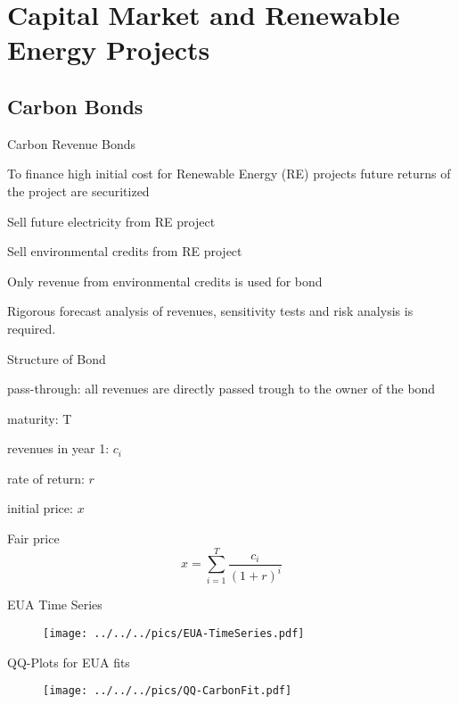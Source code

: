 \section{Capital Market and Renewable Energy Projects}
\subsection{Carbon Bonds}

{Carbon Revenue Bonds}


	To finance high initial cost for Renewable Energy (RE) projects future returns of the project are securitized

	


	Sell future electricity from RE project

	Sell environmental credits from RE project


	Only revenue from environmental credits is used for bond

	Rigorous forecast analysis of revenues, sensitivity tests and risk analysis is required.


{Structure of Bond}


	pass-through: all revenues are directly passed trough to the owner of the bond

	


	maturity: T

	revenues in year 1: $c_i$

	rate of return: $r$

	initial price: $x$


	Fair price
$$
x= \sum_{i=1}^T \frac{c_i}{(1+r)^i}
$$


{EUA Time Series}
\begin{figure}[h!]
\centering
\texttt{[image: ../../../pics/EUA-TimeSeries.pdf]}
\label{fig:EUA-TS}
\end{figure}

{QQ-Plots for EUA fits}
\begin{figure}[h!]
\centering
\texttt{[image: ../../../pics/QQ-CarbonFit.pdf]}
\label{fig:EUA-fits}
\end{figure}

